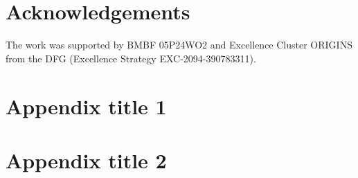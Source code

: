 \documentclass[final,5p,times,twocolumn]{elsarticle}
\begin{document}
\section*{Acknowledgements}
The work was supported by BMBF 05P24WO2 and Excellence Cluster ORIGINS from the DFG (Excellence Strategy EXC-2094-390783311).

\appendix

\section{Appendix title 1}

\section{Appendix title 2}

 







\end{document}
